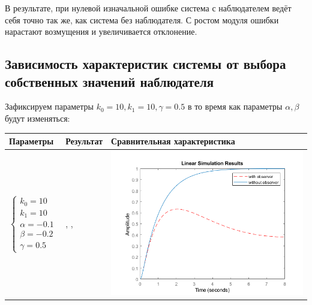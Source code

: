 \FloatBarrier

В результате, при нулевой изначальной ошибке система с наблюдателем ведёт себя точно так же, как система без наблюдателя. С ростом модуля ошибки нарастают возмущения и увеличивается отклонение.

\newpage
\subsection{Зависимость характеристик системы от выбора собственных значений наблюдателя}

Зафиксируем параметры $k_0=10, k_1=10, \gamma=0.5$  в то время как параметры $\alpha, \beta$ будут изменяться:

\begin{longtable}{ | m{2cm} | m{4cm} | m{10cm} | }
		\hline
		Параметры & Результат & Сравнительная характеристика \\ \hline
		
		$\begin{cases} k_0=10 \\ k_1=10 \\ \alpha=-0.1 \\ \beta= -0.2 \\ \gamma=0.5 \end{cases}$ &
		\text{С наблюдателем:}\linebreak
		\text{$\Omega=0.68$}, \text{$MinRe=0.1$} 
		\text{Без наблюдателя:}\linebreak
		\text{$\Omega=3.27$}, \text{$MinRe=0.97$} & 
		\begin{minipage}{.3\textwidth}
			\includegraphics[scale = 0.6]{images/g1.png}
		\end{minipage}
		\\\hline
		

\end{longtable}
